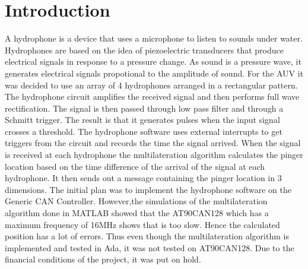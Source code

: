 \section{Introduction}\label{sec:introduction}
A hydrophone is a device that uses a microphone to listen to sounds under water. Hydrophones are based on the idea of piezoelectric transducers that produce electrical signals in response to a pressure change. As sound is a pressure wave, it generates electrical signals propotional to the amplitude of sound.
For the AUV it was decided to use an array of 4 hydrophones arranged in a rectangular pattern. 
The hydrophone circuit amplifies the received signal and then performs full wave rectification. The signal is then passed through low pass filter and through a Schmitt trigger. The result is that it generates pulses when the input signal crosses a threshold. \newline
The hydrophone software uses external interrupts to get triggers from the circuit and records the time the signal arrived. When the signal is received at each hydrophone the multilateration algorithm calculates the pinger location based on the time difference of the arrival of the signal at each hydrophone. It then sends out a message containing the pinger location in 3 dimensions.\newline
The initial plan was to implement the hydrophone software on the Generic CAN Controller. However,the simulations of the multilateration algorithm done in MATLAB showed that the AT90CAN128 which has a maximum frequency of 16MHz shows that is too slow. Hence the calculated position has a lot of errors. Thus even though the multilateration algorithm is implemented and tested in Ada, it was not tested on AT90CAN128. Due to the financial conditions of the project, it was put on hold.
  

